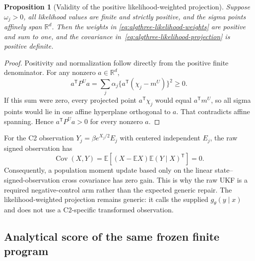 \documentclass[11pt]{article}
\newtheorem{proposition}{Proposition}
\begin{document}
\begin{proposition}[Validity of the positive likelihood-weighted projection]
\label{prop:algthree-positive-projection}
Suppose $\omega_j>0$, all likelihood values are finite and strictly positive,
and the sigma points affinely span $\mathbb R^d$.  Then the weights in
\eqref{eq:algthree-likelihood-weights} are positive and sum to one, and the
covariance in~\eqref{eq:algthree-likelihood-projection} is positive definite.
\end{proposition}

\begin{proof}
Positivity and normalization follow directly from the positive finite
denominator.  For any nonzero $a\in\mathbb R^d$,
\[
 a^\mathsf TP^Ua
 =\sum_j\alpha_j\{a^\mathsf T(\chi_j-m^U)\}^2\geq0.
\]
If this sum were zero, every projected point $a^\mathsf T\chi_j$ would equal
$a^\mathsf Tm^U$, so all sigma points would lie in one affine hyperplane
orthogonal to $a$.  That contradicts affine spanning.  Hence
$a^\mathsf TP^Ua>0$ for every nonzero $a$.
\end{proof}

For the C2 observation $Y_j=\beta e^{X_j/2}E_j$ with centered independent
$E_j$, the raw signed observation has
\begin{equation}
 \operatorname{Cov}(X,Y)
 =\mathbb E\!\left[(X-\mathbb EX)
   \mathbb E(Y\mid X)^\mathsf T\right]=0.
 \label{eq:algthree-c2-zero-gain}
\end{equation}
Consequently, a population moment update based only on the linear
state--signed-observation cross covariance has zero gain.  This is why the raw
UKF is a required negative-control arm rather than the expected generic repair.
The likelihood-weighted projection remains generic: it calls the supplied
$g_\theta(y\mid x)$ and does not use a C2-specific transformed observation.

\subsection{Analytical score of the same frozen finite program}
\end{document}
